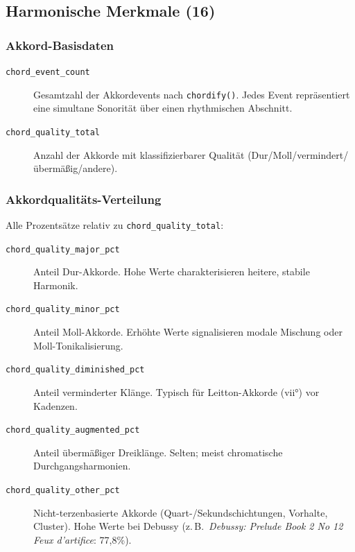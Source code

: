 \documentclass[12pt,a4paper]{article}
\theoremstyle{definition}
\begin{document}
\subsection{Harmonische Merkmale (16)}

\subsubsection*{Akkord-Basisdaten}
\begin{description}
    \item[\texttt{chord\_event\_count}] Gesamtzahl der Akkordevents nach \texttt{chordify()}. Jedes Event repräsentiert eine simultane Sonorität über einen rhythmischen Abschnitt.
    
    \item[\texttt{chord\_quality\_total}] Anzahl der Akkorde mit klassifizierbarer Qualität (Dur/Moll/vermindert/übermäßig/andere).
\end{description}

\subsubsection*{Akkordqualitäts-Verteilung}
Alle Prozentsätze relativ zu \texttt{chord\_quality\_total}:
\begin{description}
    \item[\texttt{chord\_quality\_major\_pct}] Anteil Dur-Akkorde. Hohe Werte charakterisieren heitere, stabile Harmonik.
    
    \item[\texttt{chord\_quality\_minor\_pct}] Anteil Moll-Akkorde. Erhöhte Werte signalisieren modale Mischung oder Moll-Tonikalisierung.
    
    \item[\texttt{chord\_quality\_diminished\_pct}] Anteil verminderter Klänge. Typisch für Leitton-Akkorde (vii°) vor Kadenzen.
    
    \item[\texttt{chord\_quality\_augmented\_pct}] Anteil übermäßiger Dreiklänge. Selten; meist chromatische Durchgangsharmonien.
    
    \item[\texttt{chord\_quality\_other\_pct}] Nicht-terzenbasierte Akkorde (Quart-/Sekundschichtungen, Vorhalte, Cluster). Hohe Werte bei Debussy (z.\,B.\ \emph{Debussy: Prelude Book 2 No 12 Feux d'artifice}: 77{,}8\%).
\end{description}
\end{document}
